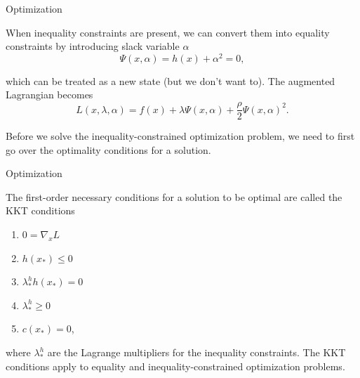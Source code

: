 \begin{frame}{Optimization} 

    When inequality constraints are present, we can convert them into equality constraints by introducing slack variable $\alpha$
% 
    \begin{equation}
        \Psi (x, \alpha) = h(x) + \alpha^2 = 0, 
    \end{equation} 

    which can be treated as a new state (but we don't want to). The augmented Lagrangian becomes 
% 
    \begin{equation}
        L(x, \lambda, \alpha) = f(x) + \lambda \Psi (x, \alpha) + \frac{\rho}{2} \Psi(x, \alpha)^2. 
    \end{equation} 

    Before we solve the inequality-constrained optimization problem, we need to first go over the optimality conditions for a solution. 



    
\end{frame} 

\begin{frame}{Optimization}

    The first-order necessary conditions for a solution to be optimal are called the KKT conditions

    \begin{enumerate}
        \item $ 0 = \nabla_x L $ 
        \item $ h(x_*) \leq 0 $ 
        \item $ \lambda_*^h h(x_*) = 0 $  
        \item $ \lambda_*^h \geq 0 $ 
        \item $ c(x_*) = 0 $, 
    \end{enumerate}

    where $ \lambda_*^h $ are the Lagrange multipliers for the inequality constraints. The KKT conditions apply to equality and inequality-constrained optimization problems. 
    
\end{frame}

